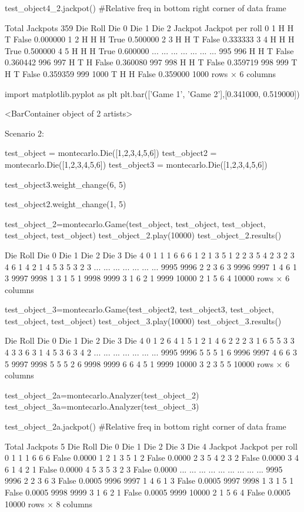 test_object4_2.jackpot()
#Relative freq in bottom right corner of data frame

Total Jackpots 359
Die	Roll	Die 0	Die 1	Die 2	Jackpot	Jackpot per roll
0	1	H	H	T	False	0.000000
1	2	H	H	H	True	0.500000
2	3	H	H	T	False	0.333333
3	4	H	H	H	True	0.500000
4	5	H	H	H	True	0.600000
...	...	...	...	...	...	...
995	996	H	H	T	False	0.360442
996	997	H	T	H	False	0.360080
997	998	H	H	T	False	0.359719
998	999	T	H	T	False	0.359359
999	1000	T	H	H	False	0.359000
1000 rows × 6 columns

import matplotlib.pyplot as plt
plt.bar(['Game 1', 'Game 2'],[0.341000, 0.519000])


<BarContainer object of 2 artists>

Scenario 2:

test_object = montecarlo.Die([1,2,3,4,5,6])
test_object2 = montecarlo.Die([1,2,3,4,5,6])
test_object3 = montecarlo.Die([1,2,3,4,5,6])

test_object3.weight_change(6, 5)

test_object2.weight_change(1, 5)

test_object_2=montecarlo.Game(test_object, test_object, test_object, test_object, test_object)
test_object_2.play(10000)
test_object_2.results()

Die	Roll	Die 0	Die 1	Die 2	Die 3	Die 4
0	1	1	1	6	6	6
1	2	1	3	5	1	2
2	3	5	4	2	3	2
3	4	6	1	4	2	1
4	5	3	5	3	2	3
...	...	...	...	...	...	...
9995	9996	2	2	3	6	3
9996	9997	1	4	6	1	3
9997	9998	1	3	1	5	1
9998	9999	3	1	6	2	1
9999	10000	2	1	5	6	4
10000 rows × 6 columns

test_object_3=montecarlo.Game(test_object2, test_object3, test_object, test_object, test_object)
test_object_3.play(10000)
test_object_3.results()

Die	Roll	Die 0	Die 1	Die 2	Die 3	Die 4
0	1	2	6	4	1	5
1	2	1	4	6	2	2
2	3	1	6	5	5	3
3	4	3	3	6	3	1
4	5	3	6	3	4	2
...	...	...	...	...	...	...
9995	9996	5	5	5	1	6
9996	9997	4	6	6	3	5
9997	9998	5	5	5	2	6
9998	9999	6	6	4	5	1
9999	10000	3	2	3	5	5
10000 rows × 6 columns

test_object_2a=montecarlo.Analyzer(test_object_2)
test_object_3a=montecarlo.Analyzer(test_object_3)

test_object_2a.jackpot()
#Relative freq in bottom right corner of data frame

Total Jackpots 5
Die	Roll	Die 0	Die 1	Die 2	Die 3	Die 4	Jackpot	Jackpot per roll
0	1	1	1	6	6	6	False	0.0000
1	2	1	3	5	1	2	False	0.0000
2	3	5	4	2	3	2	False	0.0000
3	4	6	1	4	2	1	False	0.0000
4	5	3	5	3	2	3	False	0.0000
...	...	...	...	...	...	...	...	...
9995	9996	2	2	3	6	3	False	0.0005
9996	9997	1	4	6	1	3	False	0.0005
9997	9998	1	3	1	5	1	False	0.0005
9998	9999	3	1	6	2	1	False	0.0005
9999	10000	2	1	5	6	4	False	0.0005
10000 rows × 8 columns

